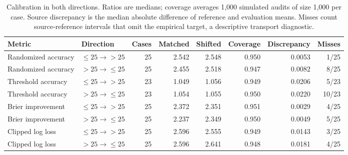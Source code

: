\begin{table}[t]
\centering
\caption{Calibration in both directions. Ratios are medians; coverage averages 1,000 simulated audits of size 1,000 per case. Source discrepancy is the median absolute difference of reference and evaluation means. Misses count source-reference intervals that omit the empirical target, a descriptive transport diagnostic.}
\label{tab:transferdetail}
\small
\setlength{\tabcolsep}{4pt}
\begin{tabular}{llrrrrrr}
\toprule
Metric & Direction & Cases & Matched & Shifted & Coverage & Discrepancy & Misses \\
\midrule
Randomized accuracy & $\le25\to>25$ & 25 & 2.542 & 2.548 & 0.950 & 0.0053 & 1/25 \\
Randomized accuracy & $>25\to\le25$ & 25 & 2.455 & 2.518 & 0.947 & 0.0082 & 8/25 \\
Threshold accuracy & $\le25\to>25$ & 23 & 1.049 & 1.056 & 0.949 & 0.0206 & 5/23 \\
Threshold accuracy & $>25\to\le25$ & 23 & 1.054 & 1.055 & 0.950 & 0.0220 & 10/23 \\
Brier improvement & $\le25\to>25$ & 25 & 2.372 & 2.351 & 0.951 & 0.0029 & 4/25 \\
Brier improvement & $>25\to\le25$ & 25 & 2.237 & 2.349 & 0.950 & 0.0049 & 5/25 \\
Clipped log loss & $\le25\to>25$ & 25 & 2.596 & 2.555 & 0.949 & 0.0143 & 3/25 \\
Clipped log loss & $>25\to\le25$ & 25 & 2.596 & 2.641 & 0.948 & 0.0181 & 4/25 \\
\bottomrule
\end{tabular}
\end{table}
